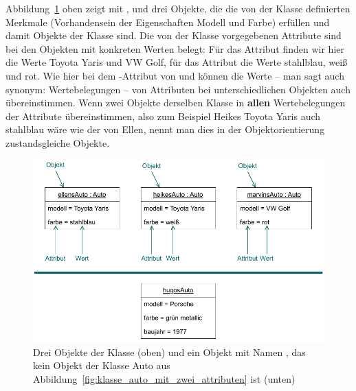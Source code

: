 Abbildung~\ref{fig:drei_mal_klasse_auto_plus_klasse_hugoauto} oben zeigt mit ,  und  drei Objekte, die die von der Klasse  definierten Merkmale (Vorhandensein der Eigenschaften Modell und Farbe) erfüllen und damit Objekte der Klasse  sind. Die von der Klasse vorgegebenen Attribute sind bei den Objekten mit konkreten Werten belegt: Für das Attribut  finden wir hier die Werte Toyota Yaris und VW Golf, für das Attribut  die Werte stahlblau, weiß und rot. Wie hier bei dem -Attribut von  und  können die Werte -- man sagt auch synonym: Wertebelegungen
-- von Attributen bei unterschiedlichen Objekten auch übereinstimmen. Wenn zwei Objekte derselben Klasse in \textbf{allen} \mbox{Wertebelegungen} der Attribute übereinstimmen, also zum Beispiel Heikes Toyota Yaris auch stahlblau wäre wie der von Ellen, nennt man dies in der Objektorientierung zustandsgleiche Objekte.

\begin{figure}[h!]
	\centering
	\includegraphics{Bilder/Kapitel-4/klasse_auto.pdf}
	\caption[Drei Objekte der Klasse ]{Drei Objekte der Klasse  (oben) und ein Objekt mit Namen , das kein Objekt der Klasse Auto aus Abbildung~\ref{fig:klasse_auto_mit_zwei_attributen} ist (unten)}
	\label{fig:drei_mal_klasse_auto_plus_klasse_hugoauto}
\end{figure}

